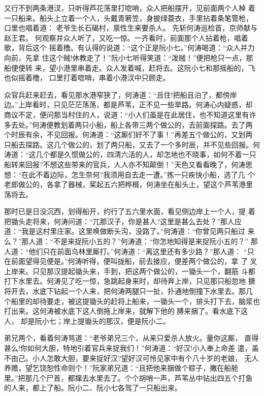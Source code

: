 又行不到两条港汊，只听得芦花荡里打唿哨，众人把船摆开，见前面两个人棹
着一只船来。船头上立着一个人，头戴青箬笠，身披绿蓑衣，手里拈着条笔管枪，
口里也唱着道：
老爷生长石碣村，禀性生来要杀人。
先斩何涛巡检首，京师献与赵王君。
何观察并众人听了，又吃一惊。一齐看时，前面那个人拈着枪，唱着歌，背后这个
摇着橹。有认得的说道：“这个正是阮小七。”何涛喝道：“众人并力向前，先拿
住这个贼!休教走了！”阮小七听得笑道：“泼贼！”便把枪只一点，那船便使转
来，望小港里串着走。众人发着喊，赶将去。这阮小七和那摇船的，飞也似摇着橹，
口里打着唿哨，串着小港汊中只顾走。

众官兵赶来赶去，看见那水港窄狭了，何涛道：“且住!把船且泊了，都傍岸
边。”上岸看时，只见茫茫荡荡，都是芦苇，正不见一些旱路。何涛心内疑惑，却
商议不定，便问那当村住的人，说道：“小人们虽是在此居住，也不知道这里有许
多去处。”何涛便教划着两只小船，船上各带三两个做公的，去前面探路。去了两
个时辰有余，不见回报。何涛道：“这厮们好不了事！”再差五个做公的，又划两
只船去探路。这几个做公的，划了两只船，又去了一个多时辰，并不见些回报。何
涛道：“这几个都是久惯做公的，四清六活的人，却怎地也不晓事，如何不着一只
船转来回报?不想这些带来的官兵，人人亦不知颠倒！”天色又看看晚了，何涛思
想：“在此不着边际，怎生奈何?我须用自去走一遭。”拣一只疾快小船，选了几
个老郎做公的，各拿了器械，桨起五六把桦楫，何涛坐在船头上，望这个芦苇港里
荡将去。

那时已是日没沉西，划得船开，约行了五六里水面，看见侧边岸上一个人，提
着把锄头走将来，何涛问道：“兀那汉子，你是甚人?这里是甚么去处？”那人应
道：“我是这村里庄家。这里唤做断头沟，没路了。”何涛道：“你曾见两只船过
来么？”那人道：“不是来捉阮小五的？”何涛道：“你怎地知得是来捉阮小五的？”
那人道：“他们只在前面乌林里厮打。”何涛道：“离这里还有多少路？”那人道：
“只在前面望得见便是。”何涛听得，便叫拢船，前去接应，便差两个做公的，拿
了叉上岸来。只见那汉提起锄头来，手到，把这两个做公的，一锄头一个，翻筋
斗都打下水里去。何涛见了吃一惊，急跳起身来时，却待奔上岸，只见那只船忽地
搪将开去，水底下钻起一个人来，把何涛两腿只一扯，扑通地倒撞下水里去。那几
个船里的却待要走，被这提锄头的赶将上船来，一锄头一个，排头打下去，脑浆也
打出来。这何涛被水底下这人倒拖上岸来，就解下他的膊来捆了。看水底下这人，
却是阮小七；岸上提锄头的那汉，便是阮小二。

弟兄两个，看着何涛骂道：“老爷弟兄三个，从来只爱杀人放火。量你这厮，
直得甚么!你如何大胆，特地引着官兵来捉我们！”何涛道：“好汉!小人奉上命差
遣，盖不由己。小人怎敢大胆，要来捉好汉?望好汉可怜见家中有个八十岁的老娘，
无人养赡，望乞饶恕性命则个！”阮家弟兄道：“且把他来捆做个粽子，撇在船舱
里。”把那几个尸首，都撺去水里去了。个个胡哨一声，芦苇丛中钻出四五个打鱼
的人来，都上了船。阮小二、阮小七各驾了一只船出来。

